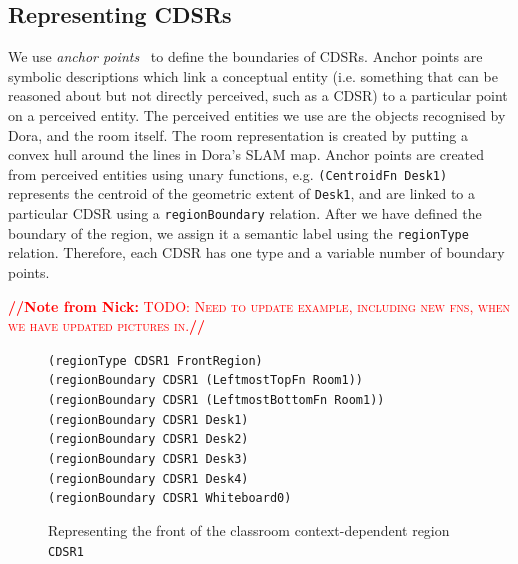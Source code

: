 \documentclass[letterpaper]{article}
\newcommand{\from}[2]{\textcolor{red}{\noindent\textbf{//}\textbf{Note
      from #1:}\textsc{ #2}\textbf{//}}}
\newcommand{\fw}[1]{\texttt{#1}}
\begin{document}


\subsection{Representing CDSRs}

We use \textit{anchor points}~\cite{Klenk/etal2005} to define the boundaries of CDSRs. Anchor points are symbolic descriptions which link a conceptual entity (i.e. something that can be reasoned about but not directly perceived, such as a CDSR) to a particular point on a perceived entity. The perceived entities we use are the objects recognised by Dora, and the room itself. The room representation is created by putting a convex hull around the lines in Dora's SLAM map. Anchor points are created from perceived entities using unary functions, e.g. \fw{(CentroidFn Desk1)} represents the centroid of the geometric extent of \fw{Desk1}, and are linked to a particular CDSR using a \fw{regionBoundary} relation. After we have defined the boundary of the region, we assign it a semantic label using the \fw{regionType} relation. Therefore, each CDSR has one type and a variable number of boundary points.


\from{Nick}{TODO: Need to update example, including new fns, when we have updated pictures in.}

\begin{figure}[h]
	{\fontsize{8}{8} %
  
\fw{(regionType CDSR1 FrontRegion)\\
(regionBoundary CDSR1 (LeftmostTopFn Room1))\\
(regionBoundary CDSR1 (LeftmostBottomFn Room1))\\
(regionBoundary CDSR1 Desk1)\\
(regionBoundary CDSR1 Desk2)\\
(regionBoundary CDSR1 Desk3)\\
(regionBoundary CDSR1 Desk4)\\
(regionBoundary CDSR1 Whiteboard0)
}}
  \caption{Representing the front of the classroom context-dependent region \fw{CDSR1}}
  \label{fig:cdsr-reps}
\end{figure}
\end{document}
